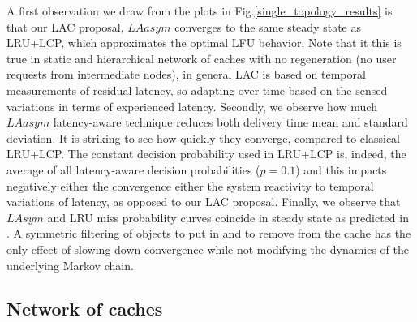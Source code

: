 \documentclass[conference]{IEEEtran}
\begin{document}
\begin{figure*}[htbp] 
\centering
{}
\caption{Single cache topology simulation: LAasym decreases LRU delivery time by 30\% and outperforms LRU+LCP on convergence.}
\label{single_topology_results}
\end{figure*}
A first observation we draw from the plots in Fig.\ref{single_topology_results} is that our LAC proposal, $LAasym$ converges to the same steady state as LRU+LCP, which approximates the optimal LFU behavior.
Note that it this is true in static and hierarchical network of caches with no regeneration (no user requests from intermediate nodes), in general LAC is based on temporal measurements of residual latency, so adapting over time based on the sensed variations in terms of experienced latency. 
Secondly, we observe how much $LAasym$ latency-aware technique reduces both delivery time mean and standard deviation. It is striking to see how quickly they converge, compared to classical LRU+LCP.
The constant decision probability used in LRU+LCP is, indeed, the average of all latency-aware decision probabilities ($p=0.1$) 
and this impacts negatively either the convergence either the system reactivity to temporal variations of latency, as opposed to our LAC proposal. 
Finally, we observe that $LAsym$ and LRU miss probability curves coincide in steady state as predicted in \cite{Jelenkovic:2004:OLC:1024662.1024670}. A symmetric filtering of objects to put in and to remove from the cache has the only effect of slowing down convergence while not modifying the dynamics of the underlying Markov chain. 

\subsection{Network of caches}
\end{document}

